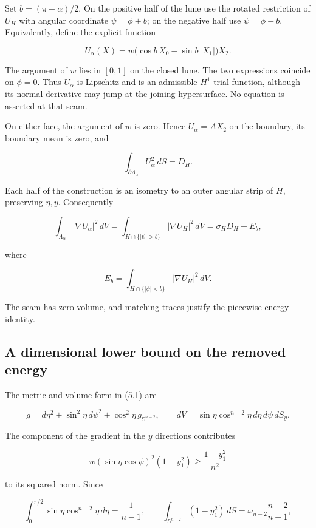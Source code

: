 \documentclass[11pt]{article}
\begin{document}
Set \(b=(\pi-\alpha)/2\). On the positive half of the lune use the
rotated restriction of \(U_H\) with angular coordinate \(\psi=\phi+b\);
on the negative half use \(\psi=\phi-b\). Equivalently, define the
explicit function

\[
U_\alpha(X)=w\bigl(\cos b\,X_0-\sin b\,|X_1|\bigr)X_2.
\tag{5.8}
\]

The argument of \(w\) lies in \([0,1]\) on the closed lune. The two
expressions coincide on \(\phi=0\). Thus \(U_\alpha\) is Lipschitz and
is an admissible \(H^1\) trial function, although its normal derivative
may jump at the joining hypersurface. No equation is asserted at that
seam.

On either face, the argument of \(w\) is zero. Hence \(U_\alpha=AX_2\)
on the boundary, its boundary mean is zero, and

\[
\int_{\partial\Lambda_\alpha}U_\alpha^2\,dS=D_H.
\tag{5.9}
\]

Each half of the construction is an isometry to an outer angular strip
of \(H\), preserving \(\eta,y\). Consequently

\[
\int_{\Lambda_\alpha}|\nabla U_\alpha|^2\,dV
=\int_{H\cap\{|\psi|>b\}}|\nabla U_H|^2\,dV
=\sigma_HD_H-E_b,
\tag{5.10}
\]

where

\[
E_b=\int_{H\cap\{|\psi|<b\}}|\nabla U_H|^2\,dV.
\tag{5.11}
\]

The seam has zero volume, and matching traces justify the piecewise
energy identity.

\subsection{A dimensional lower bound on the removed
energy}\label{a-dimensional-lower-bound-on-the-removed-energy}

The metric and volume form in (5.1) are

\[
g=d\eta^2+\sin^2\eta\,d\psi^2+\cos^2\eta\,g_{\mathbb S^{n-2}},
\qquad
dV=\sin\eta\cos^{n-2}\eta\,d\eta\,d\psi\,dS_y.
\tag{5.12}
\]

The component of the gradient in the \(y\) directions contributes

\[
w(\sin\eta\cos\psi)^2(1-y_1^2)
\geq \frac{1-y_1^2}{n^2}
\tag{5.13}
\]

to its squared norm. Since

\[
\int_0^{\pi/2}\sin\eta\cos^{n-2}\eta\,d\eta=\frac1{n-1},
\qquad
\int_{\mathbb S^{n-2}}(1-y_1^2)\,dS
=\omega_{n-2}\frac{n-2}{n-1},
\tag{5.14}
\]
\end{document}
